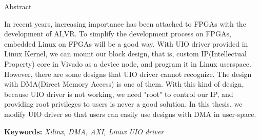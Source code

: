 \begin{center}
\large{Abstract}
\end{center}
In recent years, increasing importance has been attached to FPGAs with the development of AI,VR. To simplify the development process on FPGAs, embedded Linux on FPGAs will be a good way. With UIO driver provided in Linux Kernel, we can mount our block design, that is, custom IP(Intellectual Property) core in Vivado as a device node, and program it in Linux userspace. However, there are some designs that UIO driver cannot recognize. The design with DMA(Direct Memory Access) is one of them. With this kind of design, because UIO driver is not working, we need "root" to control our IP, and providing root privileges to users is never a good solution. In this thesis, we modify UIO driver so that users can easily use designs with DMA in user-space.   



\vspace*{2em}
{\bf Keywords:} \emph{Xilinx, DMA, AXI, Linux UIO driver}
